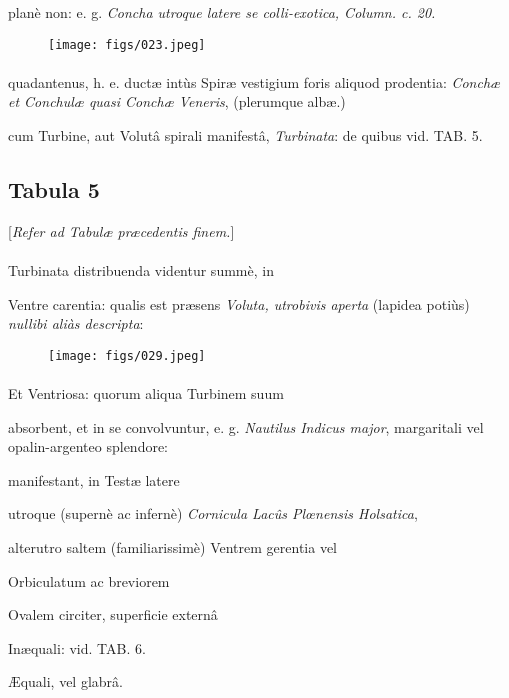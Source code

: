 \documentclass[a4paper, 11pt, oneside, polutonikogreek, german]{article}
\begin{document}
planè non: e. g. \emph{Concha utroque latere se colli-exotica, Column. c. 20.}
\begin{figure}[H]
\centering
\texttt{[image: figs/023.jpeg]}
\end{figure}
\paragraph{}
quadantenus, h. e. ductæ intùs Spiræ vestigium foris aliquod prodentia: \emph{Conchæ et Conchulæ quasi Conchæ Veneris}, (plerumque albæ.)

cum Turbine, aut Volutâ spirali manifestâ, \emph{Turbinata}: de quibus vid. TAB. 5.
\clearpage
\subsection{Tabula 5}
\begin{center}
[\emph{Refer ad Tabulæ præcedentis finem.}]
\end{center}
\paragraph{}
Turbinata distribuenda videntur summè, in

Ventre carentia: qualis est præsens \emph{Voluta, utrobivis aperta} (lapidea potiùs) \emph{nullibi aliàs descripta}:

\begin{figure}[H]
\centering
\texttt{[image: figs/029.jpeg]}
\end{figure}
\paragraph{}
Et Ventriosa: quorum aliqua Turbinem suum

absorbent, et in se convolvuntur, e. g. \emph{Nautilus Indicus major}, margaritali vel opalin-argenteo splendore:

manifestant, in Testæ latere

utroque (supernè ac infernè) \emph{Cornicula Lacûs Plœnensis Holsatica},

alterutro saltem (familiarissimè) Ventrem gerentia vel

Orbiculatum ac breviorem

Ovalem circiter, superficie externâ

Inæquali: vid. TAB. 6.

Æquali, vel glabrâ.
\end{document}
